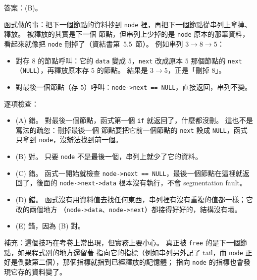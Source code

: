\begin{pastsoln}
答案：(B)。

函式做的事：把下一個節點的資料抄到 \texttt{node} 裡，再把下一個節點從串列上拿掉、釋放。 被釋放的其實是下一個
節點，但串列上少掉的是 \texttt{node} 原本的那筆資料，看起來就像把 \texttt{node} 刪掉了（資結書第~5.5~節）。
例如串列 $3 \to 8 \to 5$：
\begin{itemize}
\item 對存 $8$ 的節點呼叫：它的 \texttt{data} 變成 $5$，\texttt{next} 改成原本 $5$ 那個節點的 \texttt{next}
（\texttt{NULL}），再釋放原本存 $5$ 的節點。 結果是 $3 \to 5$，正是「刪掉 $8$」。
\item 對最後一個節點（存 $5$）呼叫：\texttt{node->next == NULL}，直接返回，串列不變。
\end{itemize}

逐項檢查：
\begin{itemize}
\item (A) 錯。 對最後一個節點，函式第一個 \texttt{if} 就返回了，什麼都沒刪。 這也不是寫法的疏忽：刪掉最後一個
節點要把它前一個節點的 \texttt{next} 設成 \texttt{NULL}，函式只拿到 \texttt{node}，沒辦法找到前一個。
\item (B) 對。 只要 \texttt{node} 不是最後一個，串列上就少了它的資料。
\item (C) 錯。 函式一開始就檢查 \texttt{node->next == NULL}，最後一個節點在這裡就返回了，後面的
\texttt{node->next->data} 根本沒有執行，不會 segmentation fault。
\item (D) 錯。 函式沒有用資料值去找任何東西，串列裡有沒有重複的值都一樣；它改的兩個地方
（\texttt{node->data}、\texttt{node->next}）都接得好好的，結構沒有壞。
\item (E) 錯，因為 (B) 對。
\end{itemize}

補充：這個技巧在考卷上常出現，但實務上要小心。 真正被 \texttt{free} 的是下一個節點，如果程式別的地方還留著
指向它的指標（例如串列另外記了 tail，而 \texttt{node} 正好是倒數第二個），那個指標就指到已經釋放的記憶體；
指向 \texttt{node} 的指標也會發現它存的資料變了。
\end{pastsoln}
